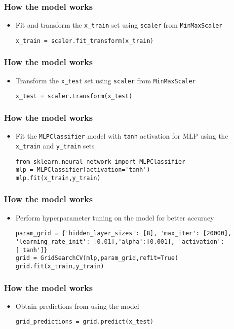 \begin{frame}[fragile]
\frametitle{How the model works}
	\begin{itemize}
		\item Fit and transform the \texttt{x\_train} set using \texttt{scaler} from \texttt{MinMaxScaler}
\begin{verbatim}
x_train = scaler.fit_transform(x_train)
\end{verbatim}
	\end{itemize}
\end{frame}

\begin{frame}[fragile]
\frametitle{How the model works}
	\begin{itemize}
		\item Transform the \texttt{x\_test} set using \texttt{scaler} from \texttt{MinMaxScaler}
\begin{verbatim}
x_test = scaler.transform(x_test)
\end{verbatim}
	\end{itemize}
\end{frame}

\begin{frame}[fragile]
\frametitle{How the model works}
	\begin{itemize}
		\item Fit the \texttt{MLPClassifier} model with \texttt{tanh} activation for MLP using the \texttt{x\_train} and \texttt{y\_train} sets
\begin{verbatim}
from sklearn.neural_network import MLPClassifier
mlp = MLPClassifier(activation='tanh')
mlp.fit(x_train,y_train)
\end{verbatim}
	\end{itemize}
\end{frame}

\begin{frame}[fragile]
\frametitle{How the model works}
	\begin{itemize}
		\item Perform hyperparameter tuning on the model for better accuracy
\begin{verbatim}
param_grid = {'hidden_layer_sizes': [8], 'max_iter': [20000], 'learning_rate_init': [0.01],'alpha':[0.001], 'activation': ['tanh']} 
grid = GridSearchCV(mlp,param_grid,refit=True)
grid.fit(x_train,y_train)
\end{verbatim}
	\end{itemize}
\end{frame}

\begin{frame}[fragile]
\frametitle{How the model works}
	\begin{itemize}
		\item Obtain predictions from using the model
\begin{verbatim}
grid_predictions = grid.predict(x_test)
\end{verbatim}
	\end{itemize}
\end{frame}
